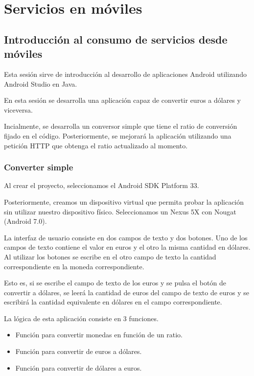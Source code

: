 \chapter{Servicios en móviles}\label{chap:7}
\section{Introducción al consumo de servicios desde móviles}

Esta sesión sirve de introducción al desarrollo de aplicaciones Android
utilizando Android Studio en Java.

En esta sesión se desarrolla una aplicación capaz de convertir euros
a dólares y viceversa.

Incialmente, se desarrolla un conversor simple que tiene el ratio de
conversión fijado en el código.
Posteriormente, se mejorará la aplicación utilizando una petición HTTP
que obtenga el ratio actualizado al momento.

\subsection{Converter simple}

Al crear el proyecto, seleccionamos el Android SDK Platform 33.

Posteriormente, creamos un dispositivo virtual que permita probar la
aplicación sin utilizar nuestro dispositivo físico.
Seleccionamos un Nexus 5X con Nougat (Android 7.0).

La interfaz de usuario consiste en dos campos de texto y dos botones.
Uno de los campos de texto contiene el valor en euros
y el otro la misma cantidad en dólares.
Al utilizar los botones se escribe en el otro campo de texto la cantidad
correspondiente en la moneda correspondiente.

Esto es, si se escribe el campo de texto de los euros
y se pulsa el botón de convertir a dólares,
se leerá la cantidad de euros del campo de texto de euros
y se escribirá la cantidad equivalente en dólares en el campo correspondiente.

La lógica de esta aplicación consiste en 3 funciones.

\begin{itemize}
    \item Función para convertir monedas en función de un ratio.
    \item Función para convertir de euros a dólares.
    \item Función para convertir de dólares a euros.
\end{itemize}

